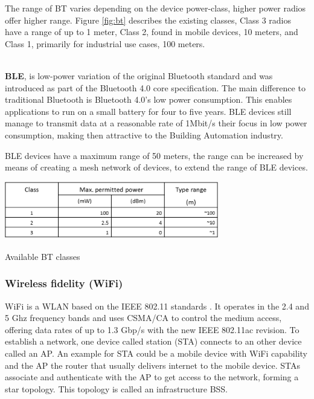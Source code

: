 The range of \ac{BT} varies depending on the device power-class, higher power radios offer higher range. Figure \ref{fig:bt} describes the existing classes, Class 3 radios have a range of up to 1 meter, Class 2, found in mobile devices, 10 meters, and Class 1, primarily for industrial use cases, 100 meters.

\mbox{}\\
\textbf{\ac{BLE}}, is low-power variation of the original Bluetooth standard and was introduced as part of the Bluetooth 4.0 core specification. The main difference to traditional Bluetooth is Bluetooth 4.0's low power consumption. This enables applications to run on a small battery for four to five years. BLE devices still manage to transmit data at a reasonable rate of 1Mbit/s their focus in low power consumption, making then attractive to the Building Automation industry. 

\ac{BLE} devices have a maximum range of 50 meters, the range can be increased by means of creating a mesh network of devices, to extend the range of BLE devices. 


\begin{table}[h]
\centering
\includegraphics[width=0.7\textwidth]{Figures/bt_tabela1}
\caption{Available BT classes}
\label{fig:bt}
\end{table}


\subsubsection{Wireless fidelity (WiFi)}

\ac{WiFi} is a \ac{WLAN} based on the \ac{IEEE} 802.11 standards \cite{IEEE_wifi,std_802.11,report_802.11}. It operates in the 2.4 and 5 Ghz frequency bands and uses CSMA/CA to control the medium access, offering data rates of up to 1.3 Gbp/s with the new \ac{IEEE} 802.11ac revision.
To establish a network, one device called station (STA) connects to an other device called an \ac{AP}. An example for STA could be  a mobile device with \ac{WiFi} capability and the AP the router that usually delivers internet to the mobile device.
STAs associate and authenticate with the AP to get access to the network, forming a star topology. This topology is called an infrastructure \ac{BSS}.

